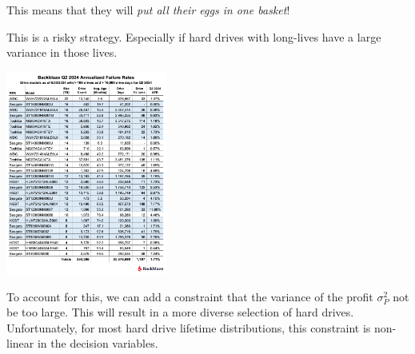 \begin{slide}

This means that they will \textit{put all their eggs in one basket}!

This is a risky strategy. Especially if hard drives with long-lives have a large variance in those lives.

\includegraphics[width=150pt]{images/backblaze-hdd.png}

To account for this, we can add a constraint that the variance of the profit $\sigma_P^2$ not be too large.
This will result in a more diverse selection of hard drives.
Unfortunately, for most hard drive lifetime distributions, this constraint is non-linear in the decision variables. 

	
\end{slide}






